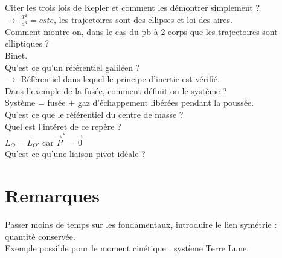 \documentclass[12pt,prb,aps,epsf]{report}
\begin{document}
Citer les trois lois de Kepler et comment les démontrer simplement ?\\
$\rightarrow$  $\frac{T^2}{a^3} = cste$, les trajectoires sont des ellipses et loi des aires.\\

Comment montre on, dans le cas du pb à 2 corps que les trajectoires sont elliptiques ?\\
Binet.\\

Qu'est ce qu'un référentiel galiléen ?\\
$\rightarrow$ Référentiel dans lequel le principe d'inertie est vérifié.\\

Dans l'exemple de la fusée, comment définit on le système ?\\
Système = fusée + gaz d'échappement libérées pendant la poussée.\\

Qu'est ce que le référentiel du centre de masse ?\\
Quel est l'intéret de ce repère ? \\
$L_O=L_{O'}$ car $\vec{P}^*=\vec{0}$\\

Qu'est ce qu'une liaison pivot idéale ?

\section{Remarques}
Passer moins de temps sur les fondamentaux, introduire le lien symétrie : quantité conservée.\\
Exemple possible pour le moment cinétique : système Terre Lune.
\end{document}
